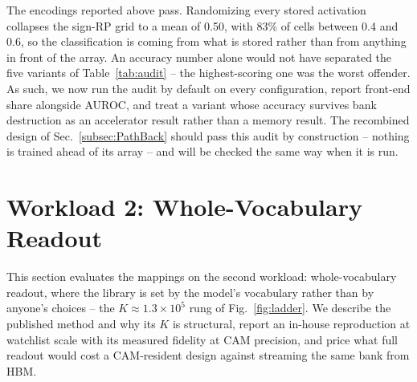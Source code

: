 \documentclass[conference]{IEEEtran}
\newcommand{\cam}{{CAM}\xspace}
\newcommand{\auroc}{{AUROC}\xspace}
\newcommand{\signrp}{{sign-RP}\xspace}
\begin{document}
The encodings reported above pass. Randomizing every stored
activation collapses the \signrp grid to a mean of 0.50, with 83\%
of cells between 0.4 and 0.6, so the classification is coming from
what is stored rather than from anything in front of the array. An
accuracy number alone would not have separated the five variants of
Table~\ref{tab:audit} -- the highest-scoring one was the worst
offender. As such, we now run the audit by default on every
configuration, report front-end share alongside \auroc, and treat a
variant whose accuracy survives bank destruction as an accelerator
result rather than a memory result. The recombined design of
Sec.~\ref{subsec:PathBack} should pass this audit by construction --
nothing is trained ahead of its array -- and will be checked the
same way when it is run.


\section{Workload 2: Whole-Vocabulary Readout}
\label{sec:LargeK}

This section evaluates the mappings on the second workload:
whole-vocabulary readout, where the library is set by the model's
vocabulary rather than by anyone's choices -- the
$K\approx1.3\times10^{5}$ rung of Fig.~\ref{fig:ladder}. We describe
the published method and why its $K$ is structural, report an
in-house reproduction at watchlist scale with its measured fidelity
at \cam precision, and price what full readout would cost a
\cam-resident design against streaming the same bank from HBM.
\end{document}
